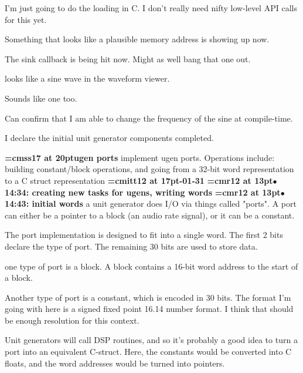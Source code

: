 I'm just going to do the loading in C. I don't really need nifty low-level API calls for this yet.
\par

Something that looks like a plausible memory address is showing up now.
\par

The sink callback is being hit now. Might as well bang that one out.
\par

looks like a sine wave in the waveform viewer.
\par

Sounds like one too.
\par

Can confirm that I am able to change the frequency of the sine at compile-time.
\par

I declare the initial unit generator components completed.
\par

{\medskip\noindent\bf\font\titlefont=cmss17 at 20pt\titlefont ugen ports}\medskip
implement ugen ports.
Operations include: building constant/block operations,
and going from a 32-bit word representation to a
C struct representation
{\medskip\noindent\bf\font\titlefont=cmitt12 at 17pt-01-31}\medskip
{\smallskip\noindent\bf\font\titlefont=cmr12 at 13pt\titlefont $\bullet$ 14:34: creating new tasks for ugens, writing words}\smallskip
{\smallskip\noindent\bf\font\titlefont=cmr12 at 13pt\titlefont $\bullet$ 14:43: initial words}\smallskip
a unit generator does I/O via things called "ports". A port can either be a pointer to a block (an audio rate signal), or it can be a constant.
\par

The port implementation is designed to fit into a single word. The first 2 bits declare the type of port. The remaining 30 bits are used to store data.
\par

one type of port is a block. A block contains a 16-bit word address to the start of a block.
\par

Another type of port is a constant, which is encoded in 30 bits. The format I'm going with here is a signed fixed point 16.14 number format. I think that should be enough resolution for this context.
\par

Unit generators will call DSP routines, and so it's probably a good idea to turn a port into an equivalent C-struct. Here, the constants would be converted into C floats, and the word addresses would be turned into pointers.
\par

